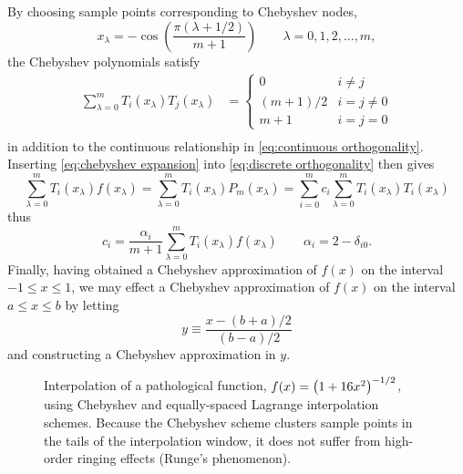 By choosing sample points corresponding to Chebyshev nodes,
\begin{equation}
  x_\lambda = -\cos(\frac{\pi (\lambda + 1/2)}{m + 1}) \qquad \lambda = 0, 1, 2, \ldots, m,
\end{equation}
the Chebyshev polynomials satisfy~\cite{Gil2007}
\begin{equation}
  \begin{aligned}
    \sum_{\lambda = 0}^{m} T_i(x_\lambda) T_j(x_\lambda) &=
    \begin{cases}
      0 & i \not = j \\
      (m + 1)/2 & i = j \not = 0 \\
      m + 1 & i = j = 0
    \end{cases} \\
  \end{aligned}
  \label{eq:discrete orthogonality}
\end{equation}
in addition to the continuous relationship in \cref{eq:continuous orthogonality}.
Inserting \cref{eq:chebyshev expansion} into \cref{eq:discrete orthogonality} then gives
\begin{equation}
  \sum_{\lambda = 0}^{m} T_i(x_\lambda) f(x_\lambda) = \sum_{\lambda = 0}^{m}T_i(x_\lambda) P_m(x_\lambda) = \sum_{i = 0}^m c_i \sum_{\lambda = 0}^{m}T_i(x_\lambda) T_i(x_\lambda)
\end{equation}
thus
\begin{equation}
  c_i = \frac{\alpha_i}{m + 1} \sum_{\lambda = 0}^{m}T_i(x_\lambda) f(x_\lambda) \qquad \alpha_i = 2 - \delta_{i 0}.
  \label{eq:chebyshev coefficient}
\end{equation}
Finally, having obtained a Chebyshev approximation of $f(x)$ on the interval $-1 \leqslant x \leqslant 1$, we may effect a Chebyshev approximation of $f(x)$ on the interval $a \leqslant x \leqslant b$ by letting
\begin{equation}
  y \equiv \frac{x - (b + a)/2}{(b-a)/2}
\end{equation}
and constructing a Chebyshev approximation in $y$.

\begin{figure}
  \centering
  \caption{\label{fig:pathological interpolation} Interpolation of a pathological function, $f(x) = \qty(1 + 16x^2)^{-1/2}$, using Chebyshev and equally-spaced Lagrange interpolation schemes.
  Because the Chebyshev scheme clusters sample points in the tails of the interpolation window, it does not suffer from high-order ringing effects (Runge's phenomenon).}
\end{figure}

